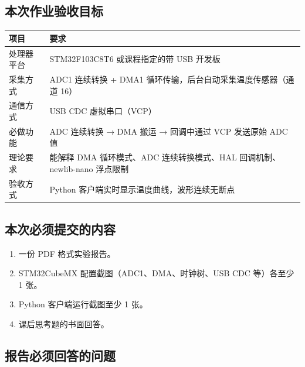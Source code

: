 \documentclass[
  chinese,
  UTF8,
  oneside,
  openany]{ctexbook}
\providecommand{\tightlist}{%
  \setlength{\itemsep}{0pt}\setlength{\parskip}{0pt}}
\begin{document}
\subsection{本次作业验收目标}\label{ux672cux6b21ux4f5cux4e1aux9a8cux6536ux76eeux6807-5}

\begin{longtable}[]{@{}
  >{\raggedright\arraybackslash}p{}
  >{\raggedright\arraybackslash}p{}@{}}
\toprule\noalign{}
\begin{minipage}[b]{\linewidth}\raggedright
项目
\end{minipage} & \begin{minipage}[b]{\linewidth}\raggedright
要求
\end{minipage} \\
\midrule\noalign{}
\endhead
\bottomrule\noalign{}
\endlastfoot
处理器平台 & STM32F103C8T6 或课程指定的带 USB 开发板 \\
采集方式 & ADC1 连续转换 + DMA1 循环传输，后台自动采集温度传感器（通道
16） \\
通信方式 & USB CDC 虚拟串口（VCP） \\
必做功能 & ADC 连续转换 → DMA 搬运 → 回调中通过 VCP 发送原始 ADC 值 \\
理论要求 & 能解释 DMA 循环模式、ADC 连续转换模式、HAL
回调机制、newlib-nano 浮点限制 \\
验收方式 & Python 客户端实时显示温度曲线，波形连续无断点 \\
\end{longtable}

\subsection{本次必须提交的内容}\label{ux672cux6b21ux5fc5ux987bux63d0ux4ea4ux7684ux5185ux5bb9-5}

\begin{enumerate}
\def\labelenumi{\arabic{enumi}.}
\tightlist
\item
  一份 PDF 格式实验报告。
\item
  STM32CubeMX 配置截图（ADC1、DMA、时钟树、USB CDC 等）各至少 1 张。
\item
  Python 客户端运行截图至少 1 张。
\item
  课后思考题的书面回答。
\end{enumerate}

\subsection{报告必须回答的问题}\label{ux62a5ux544aux5fc5ux987bux56deux7b54ux7684ux95eeux9898-5}
\end{document}
